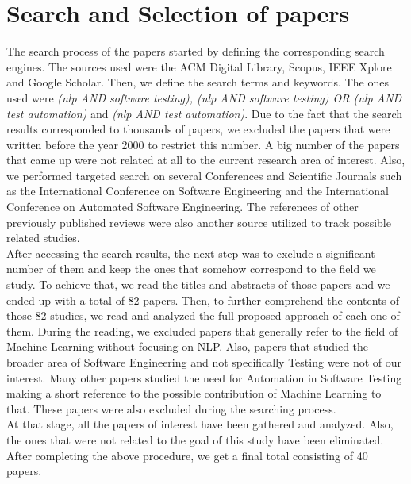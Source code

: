 \section {Search and Selection of papers}
The search process of the papers started by defining the corresponding search engines. The sources used were the ACM Digital Library, Scopus, 
IEEE Xplore and Google Scholar. Then, we define the search terms and keywords. The ones used were \emph{(nlp AND software testing), (nlp 
AND software testing) OR (nlp AND test automation)} and \emph{(nlp AND test automation)}. Due to the fact that the search results corresponded 
to thousands of papers, we excluded the papers that were written before the year 2000 to restrict this number. A big number of the papers that came up 
were not related at all to the current research area of interest. Also, we performed targeted search on several Conferences and Scientific Journals such 
as the International Conference on Software Engineering and the International Conference on Automated Software Engineering. The references of other previously 
published reviews were also another source utilized to track possible related studies. \\

After accessing the search results, the next step was to exclude a significant number of them and keep the ones that somehow correspond to the field we study. 
To achieve that, we read the titles and abstracts of those papers and we ended up with a total of 82 papers. Then, to further comprehend the contents of those 82 studies, 
we read and analyzed the full proposed approach of each one of them. During the reading, we excluded papers that generally refer to the field of 
Machine Learning without focusing on NLP. Also, papers that studied the broader area of Software Engineering and not specifically Testing were not 
of our interest. Many other papers studied the need for Automation in Software Testing making a short reference to the possible contribution of Machine 
Learning to that. These papers were also excluded during the searching process. \\

At that stage, all the papers of interest have been gathered and analyzed. Also, the ones that were not related to the goal of this study have been 
eliminated. After completing the above procedure, we get a final total consisting of 40 papers. 